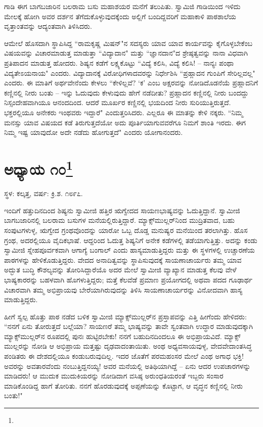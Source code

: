ಗಾಡಿ ಈಗ ಬಾಗಬಜಾರಿನ ಬಲರಾಮ ಬಸು ಮಹಾಶಯರ ಮನೆಗೆ ತಲುಪಿತು. ಸ್ವಾಮಿಜಿ ಗಾಡಿಯಿಂದ ಇಳಿದು ಮೇಲಕ್ಕೆ ಹೋಗಿ ಅವರ ದರ್ಶನ ತೆಗೆದುಕೊಳ್ಳುವುದಕ್ಕೆಂದು ಅಲ್ಲಿಗೆ ಬಂದಿದ್ದವರಿಗೆ ಮಹಾಕಾಳಿ ಪಾಠಶಾಲೆಯ ವೃತ್ತಾಂತವನ್ನು ಆದ್ಯಂತವಾಗಿ ತಿಳಿಸಿದರು.

ಆಮೇಲೆ ಹೊಸದಾಗಿ ಸ್ಥಾಪಿಸಿದ್ದ “ರಾಮಕೃಷ್ಣ ಮಿಷನ್"ನ ಸದಸ್ಯರು ಯಾವ ಯಾವ ಕಾರ್ಯವನ್ನು ಕೈಗೊಳ್ಳಬೇಕೆಂಬ ವಿಷಯವನ್ನು ವಿಚಾರಮಾಡುತ್ತ ಮಾಡುತ್ತಾ “ವಿದ್ಯಾದಾನ" ಮತ್ತು “ಜ್ಞಾನದಾನ"ದ ಶ್ರೇಷ್ಠತ್ವವನ್ನು ನಾನಾ ವಿಧವಾಗಿ ಪ್ರತಿಪಾದನ ಮಾಡುತ್ತ ಹೋದರು. ಶಿಷ್ಯನ ಕಡೆಗೆ ಲಕ್ಷ್ಯಕೊಟ್ಟು “ವಿದ್ಯೆ ಕಲಿಸಿ, ವಿದ್ಯೆ ಕಲಿಸಿ! – ನಾನ್ಯಃ ಪಂಥಾ ವಿದ್ಯತೇಽಯನಾಯ" ಎಂದರು. ವಿದ್ಯಾದಾನಕ್ಕೆ ವಿರೋಧಿಗಳಾದವರನ್ನು ನಿರ್ಧೇಶಿಸಿ “ಪ್ರಹ್ಲಾದನ ಗುಂಪಿಗೆ ಸೇರಿಲ್ಲವಲ್ಲ" ಎಂದರು. ಈ ಮಾತಿಗೆ ಅರ್ಥವೇನೆಂದು ಕೇಳಲು “ಕೇಳಿಲ್ಲವೆ? ‘ಕ’ ಎಂಬ ಅಕ್ಷರವನ್ನು ನೋಡಿದೊಡನೆಯೆ ಪ್ರಹ್ಲಾದನಿಗೆ ಕಣ್ಣಿನಲ್ಲಿ ನೀರು ಬಂತು – ಇನ್ನು ಓದುವುದು ಕೇಳುವುದು ಹೇಗೆ ನಡೆದೀತು? ಪ್ರಹ್ಲಾದನ ಕಣ್ಣಿನಲ್ಲಿ ನೀರು ಬಂದದ್ದು ನಿಸ್ಸಂದೇಹವಾಗಿಯೂ ಆನಂದದಿಂದ. ಆದರೆ ಮೂರ್ಖರ ಕಣ್ಣಿನಲ್ಲಿ ಭಯದಿಂದ ನೀರು ಸುರಿಯುತ್ತಿರುತ್ತದೆ. ಭಕ್ತರಲ್ಲಿಯೂ ಅನೇಕರು ಇಂಥವರು ಇದ್ದಾರೆ" ಎಂದುತ್ತರಿಸಿದರು. ಎಲ್ಲರೂ ಈ ಮಾತನ್ನು ಕೇಳಿ ನಕ್ಕರು. “ನಿಮ್ಮ ಮನಸ್ಸು ಯಾವ ವಿಷಯದ ಕಡೆ ತಿರುಗುತ್ತದೆಯೋ ಅದು ಪೂರ್ತಿಯಾಗುವವರೆಗೂ ನಿಮಗೆ ಶಾಂತಿ ಇರದು. ಈಗ ನಿಮ್ಮ ಇಷ್ಟ ಯಾವುದೋ ಅದೇ ನಡೆದು ಹೋಗುತ್ತದೆ" ಎಂದರು ಯೋಗಾನಂದರು.

\newpage

\chapter[ಅಧ್ಯಾಯ ೧೦]{ಅಧ್ಯಾಯ ೧೦\protect\footnote{}}

\centerline{ಸ್ಥಳ: ಕಲ್ಕತ್ತ, ವರ್ಷ: ಕ್ರಿ.ಶ. ೧೮೯೭.}

ಇಂದಿಗೆ ಹತ್ತುದಿನದಿಂದ ಶಿಷ್ಯನು ಸ್ವಾಮೀಜಿ ಹತ್ತಿರ ಋಗ್ವೇದದ ಸಾಯಣಭಾಷ್ಯವನ್ನು ಓದುತ್ತಿದ್ದಾನೆ. ಸ್ವಾಮೀಜಿ ಬಾಗಬಜಾರಿನಲ್ಲಿ ಬಲರಾಮ ಬಸುಗಳ ಮನೆಯಲ್ಲಿರುತ್ತಿದ್ದಾರೆ. ಮ್ಯಾಕ್ಸ್‌ಮುಲ್ಲರ್‌ನಿಂದ ಮುದ್ರಿತವಾದ, ಬಹು ಸಂಪುಟಗಳುಳ್ಳ, ಋಗ್ವೇದ ಗ್ರಂಥವೊಂದನ್ನು ಯಾರೋ ಒಬ್ಬ ದೊಡ್ಡ ಮನುಷ್ಯರ ಮನೆಯಿಂದ ತರಲಾಗಿತ್ತು. ಹೊಸ ಗ್ರಂಥ, ಅದರಲ್ಲಿಯೂ ವೈದಿಕಭಾಷೆ. ಆದ್ದರಿಂದ ಓದುತ್ತ ಶಿಷ್ಯನಿಗೆ ಅನೇಕ ಕಡೆಗಳಲ್ಲಿ ತಡೆಯಾಗುತ್ತಿತ್ತು. ಅದನ್ನು ಕಂಡು ಸ್ವಾಮೀಜಿ ಸ್ನೇಹಪೂರ್ವಕವಾಗಿ ಆಗಾಗ್ಯೆ ಬಂಗಾಲ್ ಎಂದು ಹಾಸ್ಯಮಾಡುತ್ತಿದ್ದರು ಮತ್ತು ಈ ಸ್ಥಳಗಳಲ್ಲಿ ಉಚ್ಚಾರಣೆಯ ಪಾಠಗಳನ್ನು ಹೇಳಿಕೊಡುತ್ತಿದ್ದರು. ವೇದದ ಅನಾದಿತ್ವವನ್ನು ಸ್ಥಾಪಿಸುವುದಕ್ಕೆ ಸಾಯಣಾಚಾರ್ಯರು ತಮ್ಮ ಯಾವ ಅದ್ಭುತ ಬುದ್ಧಿ ಕೌಶಲ್ಯವನ್ನು ತೋರಿಸಿದ್ದಾರೆಯೊ ಅದರ ಮೇಲೆ ಸ್ವಾಮೀಜಿ ವ್ಯಾಖ್ಯಾನ ಮಾಡುತ್ತ ಕೆಲವು ವೇಳೆ ಭಾಷ್ಯಕಾರರನ್ನು ಬಹಳವಾಗಿ ಹೊಗಳುತ್ತಿದ್ದರು; ಮತ್ತೆ ಕೆಲವೆಡೆ ಪ್ರಮಾಣ ಪ್ರಯೋಗದಲ್ಲಿ ಅಥವಾ ಪದದ ಗೂಢಾರ್ಥ ವಿಚಾರವಾಗಿ ತಮ್ಮ ಅಭಿಪ್ರಾಯವು ಬೇರೆಯಾಗಿರುವುದನ್ನು ತಿಳಿಸಿ ಸಾಯಣಾಚಾರ್ಯರನ್ನು ವಿನೋದವಾಗಿ ಹಾಸ್ಯ ಮಾಡುತ್ತಿದ್ದರು.

ಹೀಗೆ ಸ್ವಲ್ಪ ಹೊತ್ತು ಪಾಠ ನಡೆದ ಬಳಿಕ ಸ್ವಾಮೀಜಿ ಮ್ಯಾಕ್ಸ್‌ಮುಲ್ಲರ್‌ನ ಪ್ರಸ್ತಾಪವನ್ನು ಎತ್ತಿ ಹೀಗೆಂದು ಹೇಳಿದರು: “ನನಗೆ ಏನು ತೋರುತ್ತದೆ ಬಲ್ಲೆಯಾ? ಸಾಯಣರೆ ತಮ್ಮ ಭಾಷ್ಯವನ್ನು ತಾವೇ ಸ್ವಂತವಾಗಿ ಉದ್ಧಾರ ಮಾಡುವುದಕ್ಕಾಗಿ ಮ್ಯಾಕ್ಸ್‌ಮುಲ್ಲರ್‌ನ ರೂಪದಲ್ಲಿ ಪುನಃ ಹುಟ್ಟಿರಬೇಕು! ನನಗೆ ಬಹುದಿನದಿಂದಲೂ ಈ ಅಭಿಪ್ರಾಯವಿದೆ. ಮ್ಯಾಕ್ಸ್ ಮುಲ್ಲರನ್ನು ನೋಡಿ ಆ ಅಭಿಪ್ರಾಯ ಮತ್ತಷ್ಟು ದೃಢವಾದಂತಾಯಿತು. ಅಂಥ ಅಧ್ಯವಸಾಯವುಳ್ಳ, ವೇದವೇದಾಂತಸಿದ್ಧ ಪಂಡಿತರು ಈ ದೇಶದಲ್ಲಿಯೂ ಕಂಡುಬರುವುದಿಲ್ಲ. ಇದರ ಜೊತೆಗೆ ಪರಮಹಂಸರ ಮೇಲೆ ಎಂಥ ಅಗಾಧ ಭಕ್ತಿ! ಅವರನ್ನು ಅವತಾರವೆಂದು ನಂಬುತ್ತಿದ್ದನಯ್ಯ! ಅವರ ಮನೆಯಲ್ಲಿ ಅತಿಥಿಯಾಗಿದ್ದೆ – ಏನು ಆದರ ಉಪಚಾರಗಳನ್ನು ಮಾಡಿದರು! ಆ ಮುದುಕ ಮುದುಕಿಯರನ್ನು ನೋಡಿದಾಗ ವಸಿಷ್ಠ ಅರುಂಧತಿಯರಂತೆ ಇಬ್ಬರು ಸಂಸಾರ ಮಾಡಿಕೊಂಡಿದ್ದ ಹಾಗೆ ತೋರಿತು. ನನಗೆ ಹೊರಡುವುದಕ್ಕೆ ಅಪ್ಪಣೆಯನ್ನು ಕೊಟ್ಟಾಗ, ಆ ವೃದ್ಧನ ಕಣ್ಣಿನಲ್ಲಿ ನೀರು ಬಂತು!"

